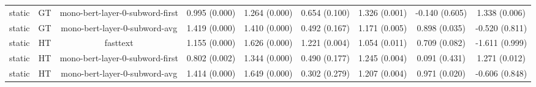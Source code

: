 \begin{sidewaystable}[htb]
\begin{tabular}{@{}ccccccccc@{}}
        static & GT & mono-bert-layer-0-subword-first & 0.995 (0.000) & 1.264 (0.000) & 0.654 (0.100) & 1.326 (0.001) & -0.140 (0.605) & 1.338 (0.006) \\
        static & GT & mono-bert-layer-0-subword-avg & 1.419 (0.000) & 1.410 (0.000) & 0.492 (0.167) & 1.171 (0.005) & 0.898 (0.035) & -0.520 (0.811) \\
        static & HT & fasttext & 1.155 (0.000) & 1.626 (0.000) & 1.221 (0.004) & 1.054 (0.011) & 0.709 (0.082) & -1.611 (0.999) \\
        static & HT & mono-bert-layer-0-subword-first & 0.802 (0.002) & 1.344 (0.000) & 0.490 (0.177) & 1.245 (0.004) & 0.091 (0.431) & 1.271 (0.012) \\
        static & HT & mono-bert-layer-0-subword-avg & 1.414 (0.000) & 1.649 (0.000) & 0.302 (0.279) & 1.207 (0.004) & 0.971 (0.020) & -0.606 (0.848) \\
        \bottomrule
    \end{tabular}
\end{sidewaystable}
